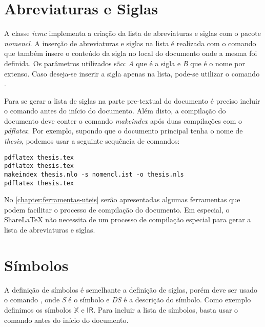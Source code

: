 \section{Abreviaturas e Siglas}

A classe \textit{icmc} implementa a criação da lista de abreviaturas e siglas com o pacote \textit{nomencl}. A inserção de abreviaturas e siglas na lista é realizada com o comando  que também insere o conteúdo da sigla no local do documento onde a mesma foi definida. Os parâmetros utilizados são: \textit{A} que é a sigla e \textit{B} que é o nome por extenso. Caso deseja-se inserir a sigla apenas na lista, pode-se utilizar o comando .

Para se gerar a lista de siglas na parte pre-textual do documento é preciso incluir o comando  antes do início do documento. Além disto, a compilação do documento deve conter o comando \textit{makeindex} após duas compilações com o \textit{pdflatex}. Por exemplo, supondo que o documento principal tenha o nome de \textit{thesis}, podemos usar a seguinte sequência de comandos:

\begin{verbatim}
pdflatex thesis.tex
pdflatex thesis.tex
makeindex thesis.nlo -s nomencl.ist -o thesis.nls
pdflatex thesis.tex
\end{verbatim}

No \autoref{chapter:ferramentas-uteis} serão apresentadas algumas ferramentas que podem facilitar o processo de compilação do documento. Em especial, o ShareLaTeX não necessita de um processo de compilação especial para gerar a lista de abreviaturas e siglas.


\section{Símbolos}

A definição de símbolos é semelhante a definição de siglas, porém deve ser usado o comando , onde \textit{S} é o símbolo e \textit{DS} é a descrição do símbolo. Como exemplo definimos os símbolos $\mathbb{X}$ e $\mathsf{I\!R}$. Para incluir a lista de símbolos, basta usar o comando  antes do início do documento.
